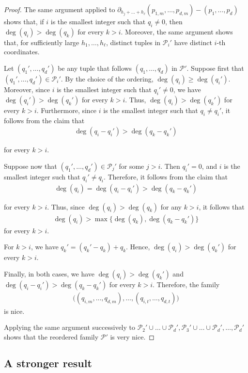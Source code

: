 \documentclass[11pt,reqno]{amsart}
\newcommand{\cP}{{\mathcal P}}
\theoremstyle{definition}
\theoremstyle{remark}
\begin{document}
\begin{proof}
The same argument applied to $\partial_{h_j+\dots+h_\ell} (p_{1,m},\dots,p_{d,m}) - (p_1,\dots,p_d)$ shows that, if $i$ is the smallest integer such that $q_i \neq 0$, then $\deg(q_i)>\deg(q_k)$ for every $k>i$. Moreover, the same argument shows that, for sufficiently large $h_1,\ldots,h_\ell$, distinct tuples in $\cP_i'$ have distinct $i$-th coordinates.

Let $(q_1',\dots,q_d')$ be any tuple that follows $(q_1,\dots,q_d)$ in $\cP'$. Suppose first that $(q_1',\dots,q_d')\in\cP_i'$. By the choice of the ordering, $\deg(q_i)\geq\deg(q_i')$. Moreover, since $i$ is the smallest integer such that $q_i'\neq 0$, we have $\deg(q_i')>\deg(q_k')$ for every $k>i$. Thus, $\deg(q_i)>\deg(q_k')$ for every $k>i$. Furthermore, since $i$ is the smallest integer such that $q_i\neq q_i'$, it follows from the claim that \begin{align*}
    \deg(q_i-q_i')>\deg(q_k-q_k')
\end{align*}

for every $k>i$.

Suppose now that $(q_1',\dots,q_d')\in\cP_j'$ for some $j>i$. Then $q_i'=0$, and $i$ is the smallest integer such that $q_i'\neq q_i$. Therefore, it follows from the claim that \begin{align*}
    \deg(q_i) = \deg(q_i-q_i')>\deg(q_k-q_k')
\end{align*}

for every $k>i$. Thus, since $\deg(q_i)>\deg(q_k)$ for any $k>i$, it follows that  \begin{align*}
    \deg(q_i)>\max\{\deg(q_k),\deg(q_k-q_k')\}
\end{align*}
for every $k>i$. 

For $k>i$, we have $q_k' = (q_k' - q_k) +q_k$. Hence, $\deg(q_i)>\deg(q_k')$ for every $k>i$. 

Finally, in both cases, we have $\deg(q_i)>\deg(q_k')$ and $\deg(q_i-q_i')>\deg(q_k-q_k')$ for every $k>i$. Therefore, the family\begin{align*}
    \big( (q_{i,m},\dots,q_{d,m}),\dots,(q_{i,t},\dots,q_{d,t}) \big)
\end{align*} is nice. 

Applying the same argument successively to $\cP_2'\cup\dots\cup\cP_d',
\cP_3'\cup\dots\cup\cP_d',\dots,\cP_d'$ shows that the reordered family $\cP'$ is very nice. 
\end{proof}

\subsection{A stronger result}
\end{document}
